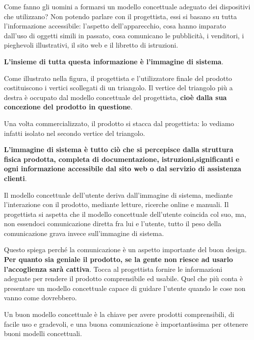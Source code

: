 Come fanno gli uomini a formarsi un modello concettuale adeguato dei dispositivi che utilizzano? Non potendo parlare con il progettista, essi si basano
su tutta l'informazione accessibile: l'aspetto dell'apparecchio, cosa hanno imparato dall'uso di oggetti simili in passato, cosa comunicano le
pubblicità, i venditori, i pieghevoli illustrativi, il sito web e il libretto di istruzioni.

\textbf{L'insieme di tutta questa informazione è l'immagine di sistema}.

Come illustrato nella figura, il progettista e l'utilizzatore finale del prodotto costituiscono i vertici scollegati di un triangolo. Il vertice
del triangolo più a destra è occupato dal modello concettuale del progettista, \textbf{cioè dalla sua concezione del prodotto in questione}.

Una volta commercializzato, il prodotto si stacca dal progettista: lo vediamo infatti isolato nel secondo vertice del triangolo.

\textbf{L'immagine di sistema è tutto ciò che si percepisce dalla struttura fisica prodotta, completa di documentazione, istruzioni,significanti e
ogni informazione accessibile dal sito web o dal servizio di assistenza clienti}.

Il modello concettuale dell'utente deriva dall'immagine di sistema, mediante l'interazione con il prodotto, mediante letture, ricerche online e manuali.
Il progettista si aspetta che il modello concettuale dell'utente coincida col suo, ma, non essendoci comunicazione diretta fra lui e l'utente, tutto il
peso della comunicazione grava invece sull'immagine di sistema.

Questo spiega perché la comunicazione è un aspetto importante del buon design. \textbf{ Per quanto sia geniale il prodotto, se la gente non riesce ad
usarlo l'accoglienza sarà cattiva}. Tocca al progettista fornire le informazioni adeguate per rendere il prodotto comprensibile ed usabile. Quel che più
conta è presentare un modello concettuale capace di guidare l'utente quando le cose non vanno come dovrebbero.

Un buon modello concettuale è la chiave per avere prodotti comprensibili, di facile uso e gradevoli, e una buona comunicazione è importantissima per
ottenere buoni modelli concettuali.